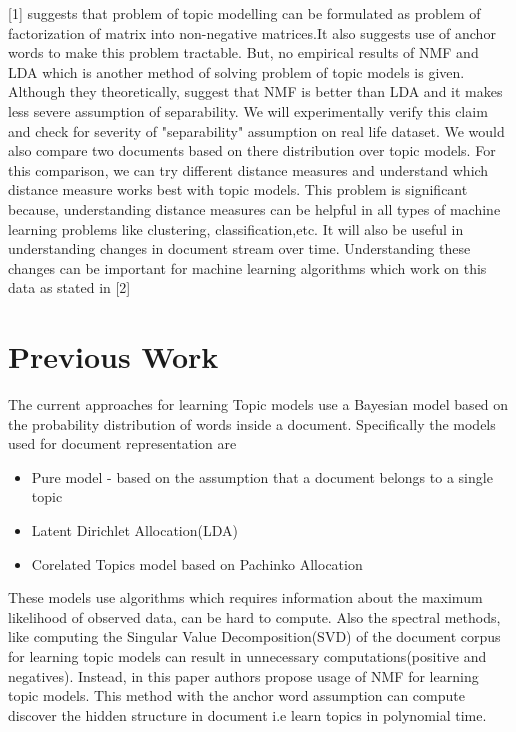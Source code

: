 \documentclass[a4paper,11pt]{article}
\begin{document}
[1] suggests that problem of topic modelling can be formulated as problem of factorization of matrix into non-negative matrices.It also suggests use of anchor words to make this problem tractable. But, no empirical results of NMF and LDA which is another method of solving problem of topic models is given. Although they theoretically, suggest that NMF is better than LDA and it makes less severe assumption of separability. We will experimentally verify this claim and check for severity of "separability" assumption on real life dataset. We would also compare two documents based on there distribution over topic models. For this comparison, we can try different distance measures and understand which distance measure works best with topic models. This problem is significant because, understanding distance measures can be helpful in all types of machine learning problems like clustering, classification,etc. It will also be useful in understanding changes in document stream over time. Understanding these changes can be important for machine learning algorithms which work on this data as stated in [2]

\section{Previous Work}

The current approaches for learning Topic models use a Bayesian model based on the probability distribution of words inside a document{\cite{blei}}. Specifically the models used for document representation are

\begin{itemize} 
\item Pure model - based on the assumption that a document belongs to a single topic
\item Latent Dirichlet Allocation(LDA)
\item Corelated Topics model based on Pachinko Allocation
\end{itemize}
These models use algorithms which requires information about the maximum likelihood of observed data, can be hard to compute. Also the spectral methods, like computing the Singular Value Decomposition(SVD) of the document corpus for learning topic models can result in unnecessary computations(positive and negatives). Instead, in this paper authors propose usage of NMF for learning topic models. This method with the anchor word assumption can compute discover the hidden structure in document i.e learn topics in polynomial time. 
\end{document}
